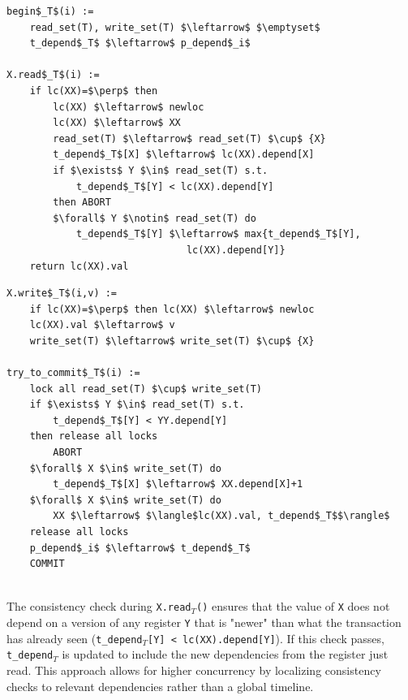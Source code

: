 \begin{minipage}{\textwidth}
\begin{minipage}{0.45\textwidth}
\begin{lstlisting}[mathescape]
begin$_T$(i) :=
    read_set(T), write_set(T) $\leftarrow$ $\emptyset$
    t_depend$_T$ $\leftarrow$ p_depend$_i$

X.read$_T$(i) :=
    if lc(XX)=$\perp$ then
        lc(XX) $\leftarrow$ newloc
        lc(XX) $\leftarrow$ XX
        read_set(T) $\leftarrow$ read_set(T) $\cup$ {X}
        t_depend$_T$[X] $\leftarrow$ lc(XX).depend[X]
        if $\exists$ Y $\in$ read_set(T) s.t.
            t_depend$_T$[Y] < lc(XX).depend[Y]
        then ABORT
        $\forall$ Y $\notin$ read_set(T) do
            t_depend$_T$[Y] $\leftarrow$ max{t_depend$_T$[Y],
                               lc(XX).depend[Y]}
    return lc(XX).val
\end{lstlisting}
\end{minipage}
\hfill
\begin{minipage}{0.45\textwidth}
\begin{lstlisting}[mathescape]
X.write$_T$(i,v) :=
    if lc(XX)=$\perp$ then lc(XX) $\leftarrow$ newloc
    lc(XX).val $\leftarrow$ v
    write_set(T) $\leftarrow$ write_set(T) $\cup$ {X}

try_to_commit$_T$(i) :=
    lock all read_set(T) $\cup$ write_set(T)
    if $\exists$ Y $\in$ read_set(T) s.t.
        t_depend$_T$[Y] < YY.depend[Y]
    then release all locks
        ABORT
    $\forall$ X $\in$ write_set(T) do
        t_depend$_T$[X] $\leftarrow$ XX.depend[X]+1
    $\forall$ X $\in$ write_set(T) do
        XX $\leftarrow$ $\langle$lc(XX).val, t_depend$_T$$\rangle$
    release all locks
    p_depend$_i$ $\leftarrow$ t_depend$_T$
    COMMIT 
\end{lstlisting}
\end{minipage}
\end{minipage}\\

The consistency check during \texttt{X.read}$_T$\texttt{()} ensures that the value of \texttt{X} does not depend on a version of any register \texttt{Y} that is "newer" than what the transaction has already seen (\texttt{t\_depend}$_T$\texttt{[Y] < lc(XX).depend[Y]}). If this check passes, \texttt{t\_depend}$_T$ is updated to include the new dependencies from the register just read. This approach allows for higher concurrency by localizing consistency checks to relevant dependencies rather than a global timeline.

